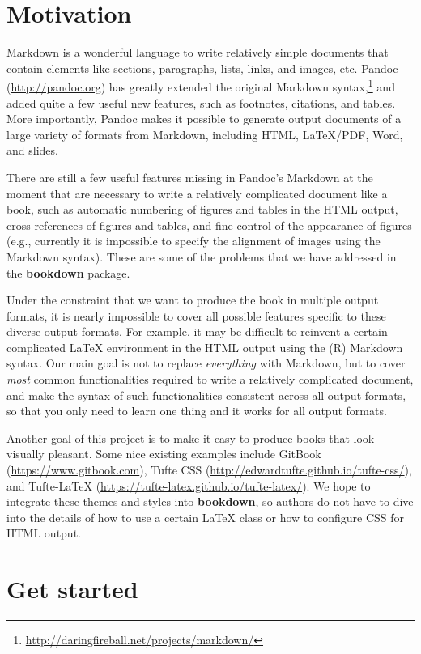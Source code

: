\documentclass[
  12pt,
]{krantz}
\renewcommand{\href}[2]{#2\footnote{\url{#1}}}
\theoremstyle{definition}
\theoremstyle{definition}
\theoremstyle{definition}
\theoremstyle{definition}
\theoremstyle{remark}
\begin{document}
\section{Motivation}\label{motivation}

Markdown is a wonderful language to write relatively simple documents that contain elements like sections, paragraphs, lists, links, and images, etc. Pandoc (\url{http://pandoc.org}) has greatly extended the \href{http://daringfireball.net/projects/markdown/}{original Markdown syntax,} and added quite a few useful new features, such as footnotes, citations, and tables. More importantly, Pandoc makes it possible to generate output documents of a large variety of formats from Markdown, including HTML, LaTeX/PDF, Word, and slides.

There are still a few useful features missing in Pandoc's Markdown at the moment that are necessary to write a relatively complicated document like a book, such as automatic numbering of figures and tables in the HTML output, cross-references of figures and tables, and fine control of the appearance of figures (e.g., currently it is impossible to specify the alignment of images using the Markdown syntax). These are some of the problems that we have addressed in the \textbf{bookdown} package.

Under the constraint that we want to produce the book in multiple output formats, it is nearly impossible to cover all possible features specific to these diverse output formats. For example, it may be difficult to reinvent a certain complicated LaTeX environment in the HTML output using the (R) Markdown syntax. Our main goal is not to replace \emph{everything} with Markdown, but to cover \emph{most} common functionalities required to write a relatively complicated document, and make the syntax of such functionalities consistent across all output formats, so that you only need to learn one thing and it works for all output formats.

Another goal of this project is to make it easy to produce books that look visually pleasant. Some nice existing examples include GitBook (\url{https://www.gitbook.com}), Tufte CSS (\url{http://edwardtufte.github.io/tufte-css/}), and Tufte-LaTeX (\url{https://tufte-latex.github.io/tufte-latex/}). We hope to integrate these themes and styles into \textbf{bookdown}, so authors do not have to dive into the details of how to use a certain LaTeX class or how to configure CSS for HTML output.

\section{Get started}\label{get-started}
\end{document}
